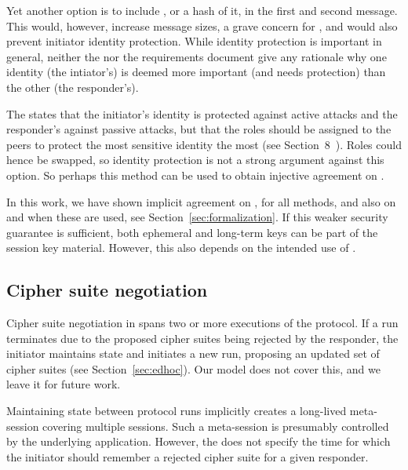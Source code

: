 \documentclass[runningheads, envcountsame, a4paper, draft, x11names]{llncs}
\newcommand{\spacehack}{\vspace{-1em}}
\newcommand{\fillhack}{\vspace{-0.5em}}
\begin{document}
Yet another option is to include \mGi{}, or a hash of it, in the first and
second message.
%
This would, however, increase message sizes, a grave concern for \mEdhoc{},
and would also prevent initiator identity protection.
%
While identity protection is important in general, neither the \mSpec{} nor
the requirements document give any rationale why one identity (the intiator's)
is deemed more important (and needs protection) than the other
(the responder's).
%

The \mSpec{} states that the initiator's identity is protected against active
attacks and the responder's against passive attacks, but that the roles should
be assigned to the \mCoap{} peers to protect the most sensitive identity the
most (see Section~8~\cite{selander-lake-edhoc-01}).
%
Roles could hence be swapped, so identity protection is not a strong argument
against this option.
%
So perhaps this method can be used to obtain injective agreement on \mGiy.
%
%

In this work, we have shown implicit agreement on \mGx{}, \mGy{} for all
methods, and also on \mGiy{} and \mGrx{} when these are used,
see Section~\ref{sec:formalization}.
%
If this weaker security guarantee is sufficient, both ephemeral and long-term
keys can be part of the session key material.
%
However, this also depends on the intended use of \mEdhoc{}.
%

\spacehack
\subsection{Cipher suite negotiation}
\label{sec:ciphersuiteNegotiation}
\fillhack
%
Cipher suite negotiation in \mEdhoc{} spans two or more executions of the
protocol.
%
If a run terminates due to the proposed cipher suites being rejected by the
responder, the initiator maintains state and initiates a new run, proposing
an updated set of cipher suites (see Section~\ref{sec:edhoc}).
%
Our model does not cover this, and we leave it for future work.

Maintaining state between protocol runs implicitly creates a long-lived
meta-session covering multiple \mEdhoc{} sessions.
%
Such a meta-session is presumably controlled by the underlying application.
%
However, the \mSpec{} does not specify the time for which the initiator should
remember a rejected cipher suite for a given responder.
%
\end{document}
